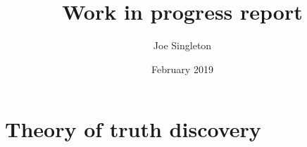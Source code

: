 \documentclass{article}
\date{February 2019}
\author{Joe Singleton}
\title{
    Work in progress report
}
\theoremstyle{definition} \newtheorem{definition}{Definition}
\theoremstyle{definition} \newtheorem{example}{Example}
\theoremstyle{plain} \newtheorem{axiom}{Axiom}
\theoremstyle{plain} \newtheorem*{remark}{Remark}
\theoremstyle{remark} \newtheorem*{notation}{Notation}
\theoremstyle{plain} \newtheorem{lemma}{Lemma}
\theoremstyle{plain} \newtheorem{theorem}{Theorem}
\theoremstyle{plain} \newtheorem{proposition}{Proposition}
\begin{document}
\maketitle

\tableofcontents



\section{Theory of truth discovery}


{}


\appendix


\end{document}
